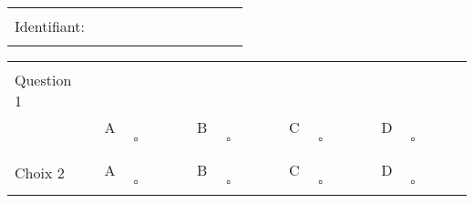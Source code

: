 \documentclass{book}%
\begin{document}
\newpage%
\thispagestyle{empty}%
\begin{flushright}%
\begin{tabular}{|l|}%
\hline%
 \\%
Identifiant: $\qquad \qquad \qquad \qquad \qquad$ \\%
 \\%
\hline%
\end{tabular}%
\end{flushright}%
\begin{center}%
\begin{tabular}{| l l l l l |}%
\hline%
 & & & & \\%
Question 1\qquad \qquad\ & & & & \\%
 & A $\qquad \square \qquad$ & B $\qquad \square \qquad$ & C $\qquad \square \qquad$ & D $\qquad \square \qquad$ \\ %
 & & & &  \\%
\hline%
 & & & &  \\%
Choix 2 & A $\qquad \square \qquad$ & B $\qquad \square \qquad$ & C $\qquad \square \qquad$ & D $\qquad \square \qquad$ \\ %
 & & & &  \\%
\hline%
\end{tabular}%
\\ \vskip3mm%
\thispagestyle{empty}%
\end{center}%
\end{document}
